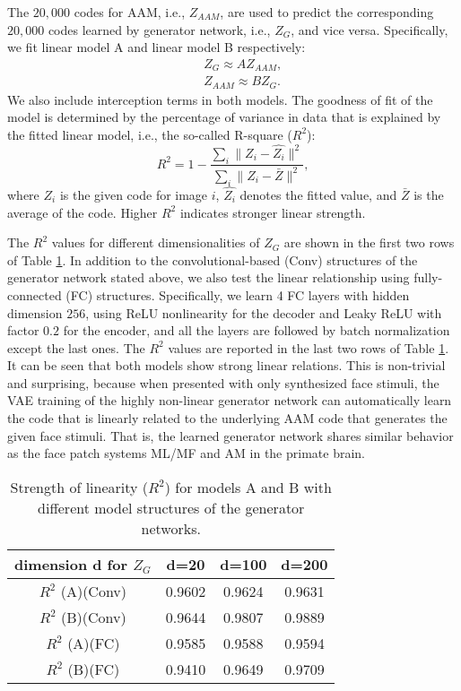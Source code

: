 \documentclass{article}
\begin{document}
The $20,000$ codes for AAM, i.e., $Z_{AAM}$, are used to predict the corresponding $20,000$ codes learned by generator network, i.e., $Z_{G}$, and vice versa. Specifically, we fit linear model A and linear model B respectively:
\begin{eqnarray}
&& Z_{G} \approx A Z_{AAM},\\
&& Z_{AAM} \approx B Z_{G}.
\end{eqnarray}
We also include interception terms in both models. The goodness of fit of the model is determined by the percentage of variance in data that is explained by the fitted linear model, i.e., the so-called R-square ($R^2$):
\begin{equation}
R^2 = 1 - \frac{\sum_i \|Z_i - \hat{Z_i}\|^2}{\sum_i \|Z_i - \bar{Z}\|^2},
\end{equation}
where $Z_i$ is the given code for image $i$, $\hat{Z_i}$ denotes the fitted value, and $\bar{Z}$ is the average of the code. Higher $R^2$ indicates  stronger linear strength.

The $R^2$ values for different dimensionalities of $Z_{G}$ are shown in the first two rows of Table \ref{tab:R2}. In addition to the convolutional-based (Conv) structures of the generator network stated above, we also test the linear relationship using fully-connected (FC) structures. Specifically, we learn 4 FC layers with hidden dimension $256$, using ReLU nonlinearity for the decoder and Leaky ReLU with factor $0.2$ for the encoder, and all the layers are followed by batch normalization except the last ones. The $R^2$ values are reported in the last two rows of Table \ref{tab:R2}. It can be seen that both models show  strong linear relations. This is non-trivial and surprising, because when presented with only synthesized face stimuli, the VAE training of the highly non-linear generator network \cite{montufar2014number} can automatically learn the code that is linearly related to the underlying AAM code that generates the given face stimuli. That is, the learned generator network shares similar behavior as the face patch systems ML/MF and AM  in the primate brain.

\begin{table}[h]
	\begin{center}
		\begin{tabular}{|c|c|c|c|}
			\hline dimension d for $Z_{G}$	&	d=20	& d=100	& d=200	\\
			\hline $R^2$ (A)(Conv)	&	0.9602	& 0.9624	& 	0.9631\\
			\hline $R^2$ (B)(Conv)    &   0.9644   &  0.9807      &   0.9889   \\ \hline
			\hline $R^2$ (A)(FC)	&	0.9585	& 0.9588	& 	0.9594\\
			\hline $R^2$ (B)(FC)   &   0.9410   &  0.9649      &   0.9709   \\
			\hline
		\end{tabular}
		\caption{Strength of linearity ($R^2$) for models A and B with different model structures of the generator networks. }
		\label{tab:R2}
	\end{center}
\end{table}
\end{document}
